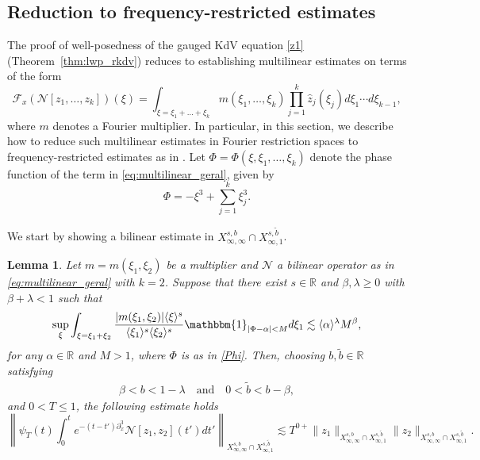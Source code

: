 \documentclass[a4paper,
11pt,  reqno]{amsart}
\newcommand{\jap}[1]{\langle #1 \rangle}
\newcommand{\5}{\textup{V}}
\newcommand{\noi}{\noindent}
\newcommand{\ft}{\widehat}
\newcommand{\les}{\lesssim}
\newcommand{\wt}{\widetilde}
\newtheorem{lemma}[theorem]{Lemma}
\theoremstyle{remark}
\newcommand{\R}{\mathbb{R}}
\newcommand{\Ft}{{\mathcal{F}}}
\numberwithin{equation}{section}
\numberwithin{theorem}{section}
\newcommand{\Ncal}{\mathcal{N}}
\begin{document}
	\subsection{Reduction to frequency-restricted estimates}\label{sec:fre}



	The proof of well-posedness of the gauged KdV equation \eqref{z1} (Theorem~\ref{thm:lwp_rkdv}) reduces to establishing multilinear estimates on terms of the form
		\begin{equation}\label{eq:multilinear_geral}
			\Ft_x (\mathcal{N}[z_1,\dots, z_k])(\xi)=\int_{\xi=\xi_1+\dots+\xi_k} m(\xi_1,\dots,\xi_k)\prod_{j=1}^k\ft{z}_j(\xi_j) d\xi_1\cdots d\xi_{k-1},
		\end{equation}
where $m$ denotes a Fourier multiplier.
In particular, in this section, we describe how to reduce such multilinear estimates in Fourier restriction spaces to frequency-restricted estimates as in \cite{CLS}. Let  $\Phi = \Phi(\xi, \xi_1, \ldots, \xi_k)$ denote the phase function of the term in \eqref{eq:multilinear_geral}, given by
\begin{equation}\label{Phi}
 \Phi=-\xi^3+\sum_{j=1}^k\xi_j^3.
\end{equation}



\noi
We start by showing a bilinear estimate in $X^{s,b}_{\infty, \infty} \cap X^{s, \wt b}_{\infty, 1}$.


		\begin{lemma}\label{lem:reduction_fre_k2}
			Let $m= m(\xi_1,\xi_2)$ be a multiplier and $\Ncal$ a bilinear operator as in \eqref{eq:multilinear_geral} with $k=2$.
Suppose that there exist $s\in\R$ and $\beta,\lambda\ge 0$ with $\beta+\lambda<1$ such that
			\begin{equation}\label{fre}
				\sup_{\xi} \int_{\xi=\xi_1+\xi_2}\frac{|m(\xi_1,\xi_2)|\jap{\xi}^s}{\jap{\xi_1}^s\jap{\xi_2}^s} \mathbbm{1}_{|\Phi-\alpha|<M} d\xi_1 \lesssim \jap{\alpha}^\lambda M^\beta,
			\end{equation}
for any $\alpha\in \R$ and $M>1$,
where $\Phi$ is as in \eqref{Phi}.
Then, choosing $b,\wt b\in\R$ satisfying
\begin{align}\label{freb}
 \beta<b<1-\lambda
\quad
\text{and}
\quad
 0<\wt{b}<b-\beta,
\end{align}
and $ 0 < T \le 1$, the following estimate holds
\begin{equation}\label{eq:bilin_infty}
    \left\|\psi_T (t)\int_0^t e^{-(t-t')\partial_x^3}\Ncal[z_1,z_2](t')dt' \right\|_{X^{s,b}_{\infty, \infty} \cap X^{s,\tilde{b}}_{\infty,1}}  \les T^{0+}\|z_1\|_{X^{s,b}_{\infty, \infty} \cap X^{s,\tilde{b}}_{\infty,1}}\|z_2\|_{X^{s,b}_{\infty, \infty} \cap X^{s,\tilde{b}}_{\infty,1}}.
\end{equation}



		\end{lemma}
\end{document}
